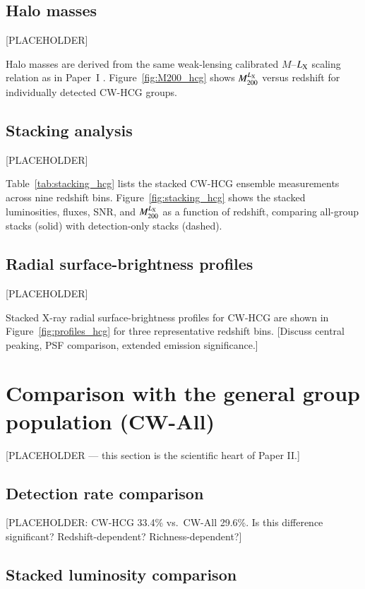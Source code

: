 \documentclass{aa}
\begin{document}
\subsection{Halo masses}

[PLACEHOLDER]

Halo masses are derived from the same weak-lensing calibrated $M$--$L_{\rm X}$ scaling relation as in Paper~I \citep{Leauthaud2010}. Figure~\ref{fig:M200_hcg} shows $M_{200}^{L_{\rm X}}$ versus redshift for individually detected CW-HCG groups.

\subsection{Stacking analysis}
\label{sec:stacking_hcg}

[PLACEHOLDER]

Table~\ref{tab:stacking_hcg} lists the stacked CW-HCG ensemble measurements across nine redshift bins. Figure~\ref{fig:stacking_hcg} shows the stacked luminosities, fluxes, SNR, and $M_{200}^{L_{\rm X}}$ as a function of redshift, comparing all-group stacks (solid) with detection-only stacks (dashed).

\subsection{Radial surface-brightness profiles}

[PLACEHOLDER]

Stacked X-ray radial surface-brightness profiles for CW-HCG are shown in Figure~\ref{fig:profiles_hcg} for three representative redshift bins. [Discuss central peaking, PSF comparison, extended emission significance.]

\section{Comparison with the general group population (CW-All)}
\label{sec:comparison}

[PLACEHOLDER --- this section is the scientific heart of Paper II.]

\subsection{Detection rate comparison}

[PLACEHOLDER: CW-HCG 33.4\% vs.\ CW-All 29.6\%. Is this difference significant? Redshift-dependent? Richness-dependent?]

\subsection{Stacked luminosity comparison}
\end{document}
